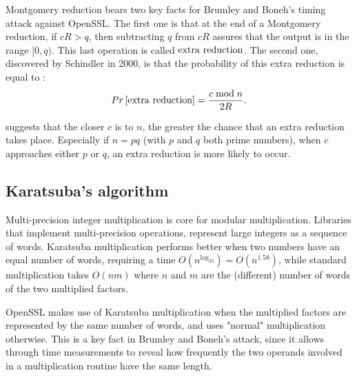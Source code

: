 Montgomery reduction bears two key facts for Brumley and Boneh's timing attack against OpenSSL. The first one is that at the end of a Montgomery reduction, if $cR > q$, then subtracting $q$ from $cR$ assures that the output is in the range $[0, q)$. This last operation is called $\operatorname{extra\ reduction}$. The second one, discovered by Schindler in 2000, is that the probability of this extra reduction is equal to \cite{bib:schindler}:
\begin{align}\label{eq:one}
  Pr\left[ \operatorname{extra\ reduction} \right] = \frac{c \bmod n}{2R}.
\end{align}

 suggests that the closer $c$ is to $n$, the greater the chance that an extra reduction takes place. Especially if $n = pq$ (with $p$ and $q$ both prime numbers), when $c$ approaches either $p$ or $q$, an extra reduction is more likely to occur.

\subsection{Karatsuba's algorithm}
Multi-precision integer multiplication is core for modular multiplication. Libraries that implement multi-precision operations, represent large integers as a sequence of words.
Karatsuba multiplication performs better when two numbers have an equal number of words, requiring a time $O(n^{\log_23}) = O(n^{1.58})$, while standard multiplication takes $O(nm)$ where $n$ and $m$ are the (different) number of words of the two multiplied factors.

OpenSSL makes use of Karatsuba multiplication when the multiplied factors are represented by the same number of words, and uses "normal" multiplication otherwise. This is a key fact in Brumley and Boneh's attack, since it allows through time measurements to reveal how frequently the two operands involved in a multiplication routine have the same length.


